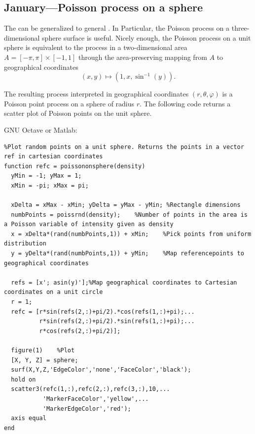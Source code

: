 \documentclass{article}
\begin{document}
        \subsection{January---Poisson process on a sphere}
        The  can be generalized to general . In Particular, the Poisson process on a three-dimensional sphere surface is useful. Nicely enough, the Poisson process on a unit sphere is equivalent to the process in a two-dimensional area $ A = [-\pi,\pi] \times [-1,1]$ through the area-preserving mapping from $A$ to geographical coordinates
        \begin{equation}
          (x,y) \mapsto (1,x,\sin^{-1}(y)) \nonumber.
        \end{equation}


        The resulting process interpreted in geographical coordinates $(r,\theta,\varphi)$ is a Poisson point process on a sphere of radius $r$. The following code returns a scatter plot of Poisson points on the unit sphere.



        GNU Octave or Matlab:
\begin{verbatim}
%Plot random points on a unit sphere. Returns the points in a vector ref in cartesian coordinates
function refc = poissononsphere(density)
  yMin = -1; yMax = 1;
  xMin = -pi; xMax = pi;
  
  xDelta = xMax - xMin; yDelta = yMax - yMin; %Rectangle dimensions
  numbPoints = poissrnd(density);    %Number of points in the area is a Poisson variable of intensity given as density
  x = xDelta*(rand(numbPoints,1)) + xMin;    %Pick points from uniform distribution
  y = yDelta*(rand(numbPoints,1)) + yMin;    %Map referencepoints to geographical coordinates

  refs = [x'; asin(y)'];%Map geographical coordinates to Cartesian coordinates on a unit circle
  r = 1;
  refc = [r*sin(refs(2,:)+pi/2).*cos(refs(1,:)+pi);...
          r*sin(refs(2,:)+pi/2).*sin(refs(1,:)+pi);...
          r*cos(refs(2,:)+pi/2)];

  figure(1)    %Plot
  [X, Y, Z] = sphere;
  surf(X,Y,Z,'EdgeColor','none','FaceColor','black');
  hold on
  scatter3(refc(1,:),refc(2,:),refc(3,:),10,...
           'MarkerFaceColor','yellow',...
           'MarkerEdgeColor','red');
  axis equal
end
\end{verbatim}
\end{document}
